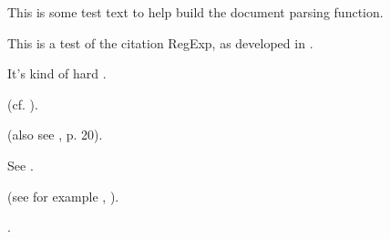 \citet{ramchand1949} This is some test text to help build the document parsing function.

This is a test of the citation RegExp, as developed in \citet{crum2020}.

It's kind of hard \citep{smith1998}.

(cf. \citealt{johns2020}).

(also see \citealt{jimothy1943}, p. 20).

See \citet{deswart2010}.

\citet{johnsetal2020}

(see for example \citealt{krifka2015}, \citealt{farkasetal2010}).

\citet{farkasetal2010}.
